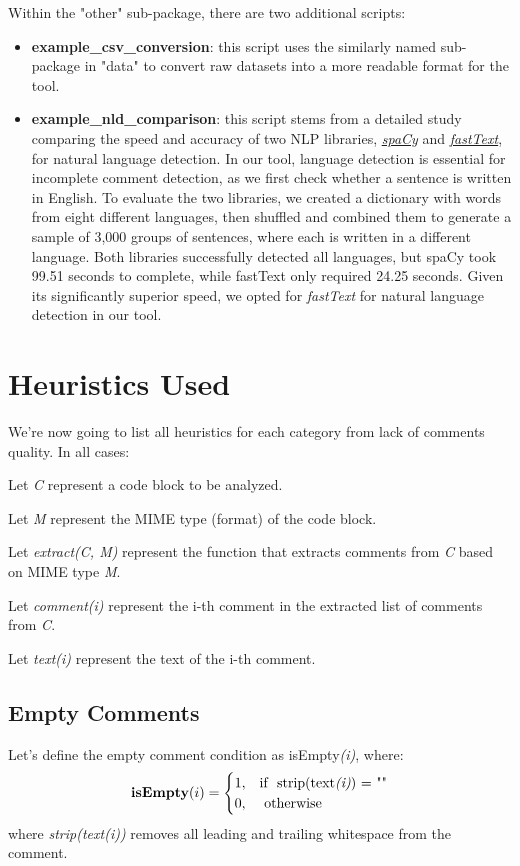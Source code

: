 \noindent Within the "other" sub-package, there are two additional scripts:
	\begin{itemize}
		\item \textbf{example\_csv\_conversion}: this script uses the similarly named sub-package in "data" to convert raw datasets into a more readable format for the tool.
		\item \textbf{example\_nld\_comparison}: this script stems from a detailed study comparing the speed and accuracy of two NLP libraries, \href{https://spacy.io/}{\textit{spaCy}} and \href{https://fasttext.cc/}{\textit{fastText}}, for natural language detection. In our tool, language detection is essential for incomplete comment detection, as we first check whether a sentence is written in English. To evaluate the two libraries, we created a dictionary with words from eight different languages, then shuffled and combined them to generate a sample of 3,000 groups of sentences, where each is written in a different language. Both libraries successfully detected all languages, but spaCy took 99.51 seconds to complete, while fastText only required 24.25 seconds. Given its significantly superior speed, we opted for \textit{fastText} for natural language detection in our tool.
	\end{itemize}
	
\section{Heuristics Used}
We're now going to list all heuristics for each category from lack of comments quality.
In all cases:

\noindent Let \textit{C} represent a code block to be analyzed.

\noindent Let \textit{M} represent the MIME type (format) of the code block.

\noindent Let \textit{extract(C, M)} represent the function that extracts comments from \textit{C} based on MIME type \textit{M}.

\noindent Let \textit{comment(i)} represent the i-th comment in the extracted list of comments from \textit{C}.

\noindent Let \textit{text(i)} represent the text of the i-th comment.

\subsection{Empty Comments}
\noindent Let's define the empty comment condition as isEmpty\textit{(i)}, where: 
\begin{equation*}
	\textbf{isEmpty}(i) = \begin{cases}
		1, & \text{if } \text{ strip(text\textit{(i)}) = ""} \\
		0, & \text{ otherwise}
	\end{cases}
\end{equation*}
where \textit{strip(text(i))} removes all leading and trailing whitespace from the comment.

